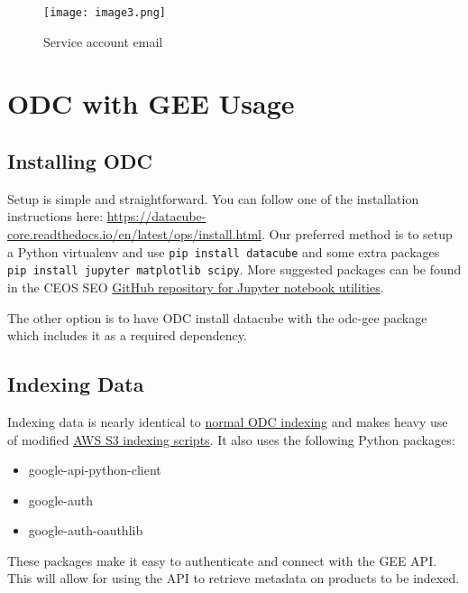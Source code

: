 \documentclass{article}
\begin{document}
\begin{figure}
	\caption{Service account email}
	\texttt{[image: image3.png]}
\end{figure}

\part{ODC with GEE Usage}
\chapter{Installing ODC}
Setup is simple and straightforward. You can follow one of the installation
instructions here:
\url{https://datacube-core.readthedocs.io/en/latest/ops/install.html}. Our
preferred method is to setup a Python virtualenv and use
\lstinline{pip install datacube} and some extra packages
\lstinline{pip install jupyter matplotlib scipy}. More suggested packages can
be found in the CEOS SEO
\href{https://github.com/ceos-seo/data_cube_utilities}{GitHub repository for
Jupyter notebook utilities}.

The other option is to have ODC install datacube with the odc-gee package which
includes it as a required dependency.

\chapter{Indexing Data}
Indexing data is nearly identical to
\href{https://datacube-core.readthedocs.io/en/latest/ops/indexing.html}{normal
ODC indexing} and makes heavy use of modified
\href{https://github.com/opendatacube/datacube-dataset-config/blob/master/scripts/index_from_s3_bucket.py}{AWS
S3 indexing scripts}. It also uses the following Python packages:
\begin{itemize}
	\item google-api-python-client
	\item google-auth
	\item google-auth-oauthlib
\end{itemize}
These packages make it easy to authenticate and connect with the GEE API. This
will allow for using the API to retrieve metadata on products to be indexed.
\end{document}
